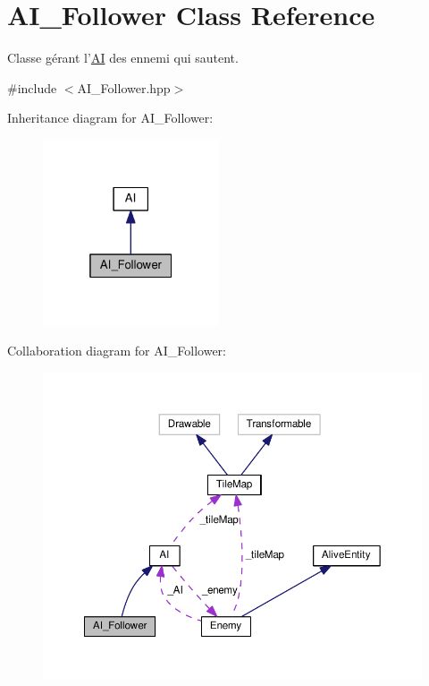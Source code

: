 \hypertarget{class_a_i___follower}{\section{A\+I\+\_\+\+Follower Class Reference}
\label{class_a_i___follower}
}


Classe gérant l'\hyperlink{class_a_i}{A\+I} des ennemi qui sautent.  




{\ttfamily \#include $<$A\+I\+\_\+\+Follower.\+hpp$>$}



Inheritance diagram for A\+I\+\_\+\+Follower\+:
\nopagebreak
\begin{figure}[H]
\begin{center}
\leavevmode
\includegraphics[width=148pt]{class_a_i___follower__inherit__graph}
\end{center}
\end{figure}


Collaboration diagram for A\+I\+\_\+\+Follower\+:
\nopagebreak
\begin{figure}[H]
\begin{center}
\leavevmode
\includegraphics[width=350pt]{class_a_i___follower__coll__graph}
\end{center}
\end{figure}
